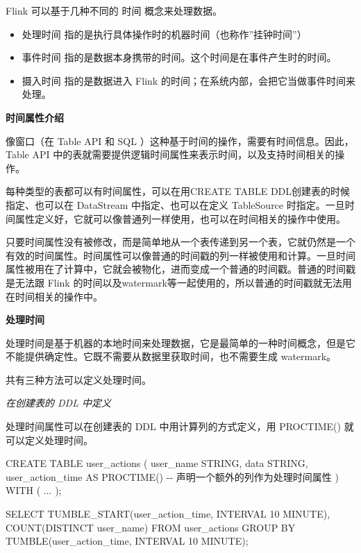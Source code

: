 \documentclass[cn,11pt,chinese]{elegantbook}
\newenvironment{Shaded}{}{}
\newcommand{\DecValTok}[1]{\textcolor[rgb]{0.25,0.63,0.44}{#1}}
\newcommand{\FunctionTok}[1]{\textcolor[rgb]{0.02,0.16,0.49}{#1}}
\newcommand{\NormalTok}[1]{#1}
\providecommand{\tightlist}{%
  \setlength{\itemsep}{0pt}\setlength{\parskip}{0pt}}
\begin{document}
Flink 可以基于几种不同的 时间 概念来处理数据。

\begin{itemize}
\tightlist
\item
  处理时间 指的是执行具体操作时的机器时间（也称作''挂钟时间''）
\item
  事件时间 指的是数据本身携带的时间。这个时间是在事件产生时的时间。
\item
  摄入时间 指的是数据进入 Flink
  的时间；在系统内部，会把它当做事件时间来处理。
\end{itemize}

\textbf{时间属性介绍}

像窗口（在 Table API 和 SQL
）这种基于时间的操作，需要有时间信息。因此，Table API
中的表就需要提供逻辑时间属性来表示时间，以及支持时间相关的操作。

每种类型的表都可以有时间属性，可以在用CREATE TABLE
DDL创建表的时候指定、也可以在 DataStream 中指定、也可以在定义
TableSource
时指定。一旦时间属性定义好，它就可以像普通列一样使用，也可以在时间相关的操作中使用。

只要时间属性没有被修改，而是简单地从一个表传递到另一个表，它就仍然是一个有效的时间属性。时间属性可以像普通的时间戳的列一样被使用和计算。一旦时间属性被用在了计算中，它就会被物化，进而变成一个普通的时间戳。普通的时间戳是无法跟
Flink
的时间以及watermark等一起使用的，所以普通的时间戳就无法用在时间相关的操作中。

\textbf{处理时间}

处理时间是基于机器的本地时间来处理数据，它是最简单的一种时间概念，但是它不能提供确定性。它既不需要从数据里获取时间，也不需要生成
watermark。

共有三种方法可以定义处理时间。

\emph{在创建表的 DDL 中定义}

处理时间属性可以在创建表的 DDL 中用计算列的方式定义，用 PROCTIME()
就可以定义处理时间。

\begin{Shaded}
\begin{Highlighting}[]
\NormalTok{CREATE TABLE }\FunctionTok{user\_actions}\NormalTok{ (}
\NormalTok{  user\_name STRING,}
\NormalTok{  data STRING,}
\NormalTok{  user\_action\_time AS }\FunctionTok{PROCTIME}\NormalTok{() {-}{-} 声明一个额外的列作为处理时间属性}
\NormalTok{) }\FunctionTok{WITH}\NormalTok{ (}
\NormalTok{  ...}
\NormalTok{);}

\NormalTok{SELECT }\FunctionTok{TUMBLE\_START}\NormalTok{(user\_action\_time, INTERVAL \textquotesingle{}}\DecValTok{10}\NormalTok{\textquotesingle{} MINUTE), }\FunctionTok{COUNT}\NormalTok{(DISTINCT user\_name)}
\NormalTok{FROM user\_actions}
\NormalTok{GROUP BY }\FunctionTok{TUMBLE}\NormalTok{(user\_action\_time, INTERVAL \textquotesingle{}}\DecValTok{10}\NormalTok{\textquotesingle{} MINUTE);}
\end{Highlighting}
\end{Shaded}
\end{document}
